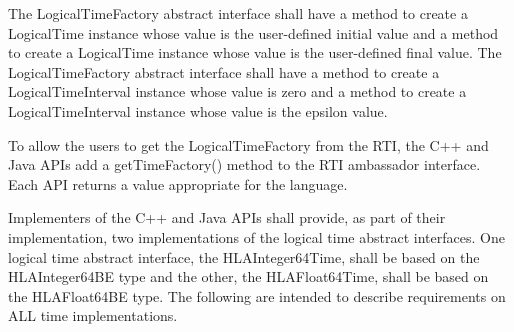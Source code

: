 \begin{compactstdpage}
    The LogicalTimeFactory abstract interface shall have a method to create a LogicalTime instance whose value is the user-defined initial value and a method to create a LogicalTime instance whose value is the user-defined final value. The LogicalTimeFactory abstract interface shall have a method to create a LogicalTimeInterval instance whose value is zero and a method to create a LogicalTimeInterval instance whose value is the epsilon value.

    To allow the users to get the LogicalTimeFactory from the RTI, the C++ and Java APIs add a getTimeFactory() method to the RTI ambassador interface. Each API returns a value appropriate for the language.

    Implementers of the C++ and Java APIs shall provide, as part of their implementation, two implementations of the logical time abstract interfaces. One logical time abstract interface, the HLAInteger64Time, shall be based on the HLAInteger64BE type and the other, the HLAFloat64Time, shall be based on the HLAFloat64BE type. The following are intended to describe requirements on ALL time implementations.

\end{compactstdpage}

\clearpage

